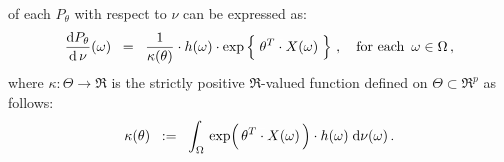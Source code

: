 \begin{definition}
\begin{enumerate}
	of each $P_{\theta}$ with respect to $\nu$ can be expressed as:
	\begin{equation*}
	\dfrac{\d P_{\theta}}{\d\,\nu}(\omega)
	\;\; = \;\;
		\dfrac{1}{\kappa(\theta)}
		\cdot
		h(\omega)
		\cdot
		\exp\left\{\; \theta^{T} \!\overset{{\color{white}-}}{\cdot}\! X(\omega) \;\right\}
		\,,
		\quad
		\textnormal{for each \,$\omega\in\Omega$}\,,
	\end{equation*}
	where $\kappa : \Theta \longrightarrow \Re$ is the strictly positive
	$\Re$-valued function defined on $\Theta \subset \Re^{p}$ as follows:
	\begin{equation*}
	\kappa(\theta)
	\;\; := \;\;
		\int_{\Omega}\,
			\exp\!\left(\,\theta^{T} \!\overset{{\color{white}-}}{\cdot}\! X(\omega)\,\right) \cdot h(\omega)
		\;\d\nu(\omega)\,.
	\end{equation*}
\end{enumerate}
\end{definition}


